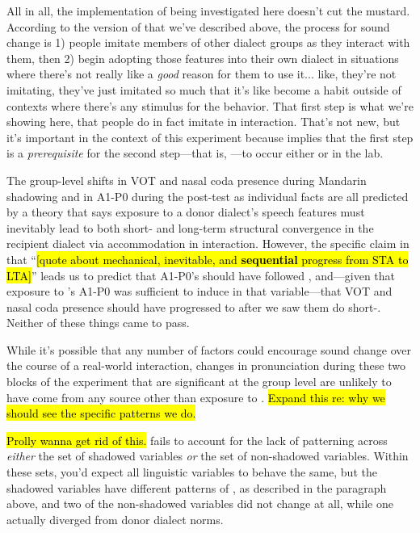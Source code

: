     All in all, the implementation of \cbat{} being investigated here doesn't cut the mustard. According to the version of \cbat{} that we've described above, the process for sound change is 1) people imitate members of other dialect groups as they interact with them, then 2) begin adopting those features into their own dialect in situations where there's not really like a \textit{good} reason for them to use it... like, they're not imitating, they've just imitated so much that it's like become a habit outside of contexts where there's any stimulus for the behavior. That first step is what we're showing here, that people do in fact imitate in interaction. That's not new, but it's important in the context of this experiment because \cbat{} implies that the first step is a \emph{prerequisite} for the second step---that is, \lta{}---to occur either \IRL{} or in the lab.

    The group-level shifts in VOT and nasal coda presence during Mandarin shadowing and in A1-P0 during the \ND{} post-test as individual facts are all predicted by a theory that says exposure to a donor dialect's speech features must inevitably lead to both short- and long-term structural convergence in the recipient dialect via accommodation in interaction. However, the specific claim in \cbat{} that ``\hl{[quote about mechanical, inevitable, and \textbf{sequential} progress from STA to LTA]}'' leads us to predict that A1-P0's \lta{} should have followed \sta{}, and---given that exposure to \annie{}'s A1-P0 was sufficient to induce \lta{} in that variable---that VOT and nasal coda presence should have progressed to \lta{} after we saw them do short-. Neither of these things came to pass.
    
    While it's possible that any number of factors could encourage sound change over the course of a real-world interaction, changes in pronunciation during these two blocks of the experiment that are significant at the group level are unlikely to have come from any source other than exposure to \annie{}. \hl{Expand this re: why we should see the specific patterns we do.}
    
    \hl{Prolly wanna get rid of this.} \cbat{} fails to account for the lack of patterning across \emph{either} the set of shadowed variables \emph{or} the set of non-shadowed variables. Within these sets, you'd expect all linguistic variables to behave the same, but the shadowed variables have different patterns of \sla{}, as described in the paragraph above, and two of the non-shadowed variables did not change at all, while one actually diverged from donor dialect norms.
    
